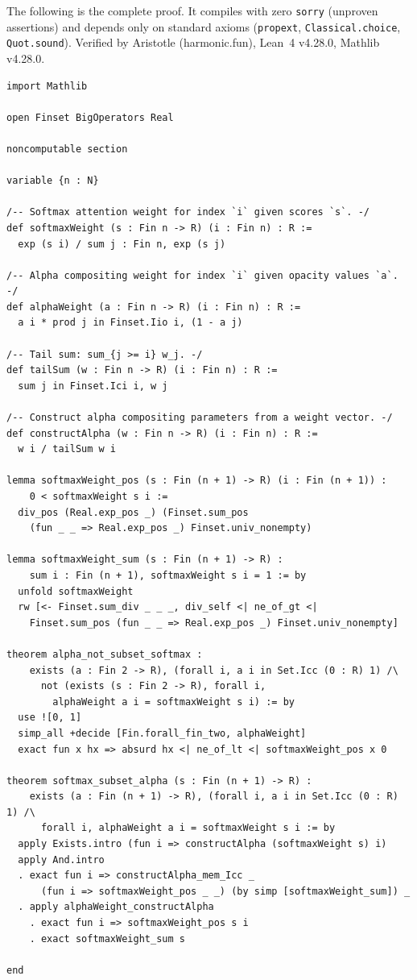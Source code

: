 \documentclass[11pt]{article}
\begin{document}
The following is the complete proof. It compiles with zero \texttt{sorry} (unproven assertions) and depends only on standard axioms (\texttt{propext}, \texttt{Classical.choice}, \texttt{Quot.sound}). Verified by Aristotle (harmonic.fun), Lean~4 v4.28.0, Mathlib v4.28.0.

\begin{lstlisting}
import Mathlib

open Finset BigOperators Real

noncomputable section

variable {n : N}

/-- Softmax attention weight for index `i` given scores `s`. -/
def softmaxWeight (s : Fin n -> R) (i : Fin n) : R :=
  exp (s i) / sum j : Fin n, exp (s j)

/-- Alpha compositing weight for index `i` given opacity values `a`. -/
def alphaWeight (a : Fin n -> R) (i : Fin n) : R :=
  a i * prod j in Finset.Iio i, (1 - a j)

/-- Tail sum: sum_{j >= i} w_j. -/
def tailSum (w : Fin n -> R) (i : Fin n) : R :=
  sum j in Finset.Ici i, w j

/-- Construct alpha compositing parameters from a weight vector. -/
def constructAlpha (w : Fin n -> R) (i : Fin n) : R :=
  w i / tailSum w i

lemma softmaxWeight_pos (s : Fin (n + 1) -> R) (i : Fin (n + 1)) :
    0 < softmaxWeight s i :=
  div_pos (Real.exp_pos _) (Finset.sum_pos
    (fun _ _ => Real.exp_pos _) Finset.univ_nonempty)

lemma softmaxWeight_sum (s : Fin (n + 1) -> R) :
    sum i : Fin (n + 1), softmaxWeight s i = 1 := by
  unfold softmaxWeight
  rw [<- Finset.sum_div _ _ _, div_self <| ne_of_gt <|
    Finset.sum_pos (fun _ _ => Real.exp_pos _) Finset.univ_nonempty]

theorem alpha_not_subset_softmax :
    exists (a : Fin 2 -> R), (forall i, a i in Set.Icc (0 : R) 1) /\
      not (exists (s : Fin 2 -> R), forall i,
        alphaWeight a i = softmaxWeight s i) := by
  use ![0, 1]
  simp_all +decide [Fin.forall_fin_two, alphaWeight]
  exact fun x hx => absurd hx <| ne_of_lt <| softmaxWeight_pos x 0

theorem softmax_subset_alpha (s : Fin (n + 1) -> R) :
    exists (a : Fin (n + 1) -> R), (forall i, a i in Set.Icc (0 : R) 1) /\
      forall i, alphaWeight a i = softmaxWeight s i := by
  apply Exists.intro (fun i => constructAlpha (softmaxWeight s) i)
  apply And.intro
  . exact fun i => constructAlpha_mem_Icc _
      (fun i => softmaxWeight_pos _ _) (by simp [softmaxWeight_sum]) _
  . apply alphaWeight_constructAlpha
    . exact fun i => softmaxWeight_pos s i
    . exact softmaxWeight_sum s

end
\end{lstlisting}
\end{document}
